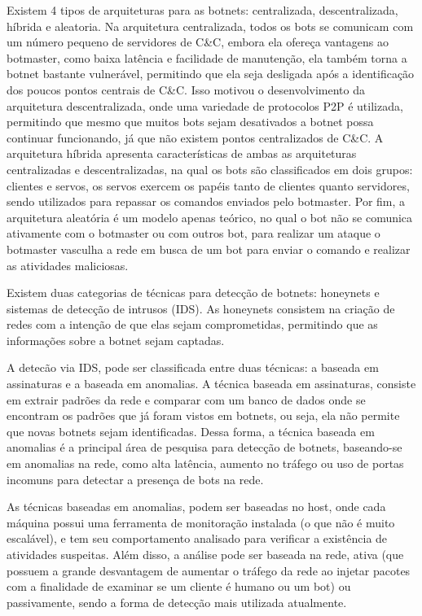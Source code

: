 Existem 4 tipos de arquiteturas para as botnets: centralizada, descentralizada, híbrida e aleatoria. Na arquitetura centralizada, todos os bots se comunicam com um número pequeno de servidores de C\&C, embora ela ofereça vantagens ao botmaster, como baixa latência e facilidade de manutenção, ela também torna a botnet bastante vulnerável, permitindo que ela seja desligada após a identificação dos poucos pontos centrais de C\&C. Isso motivou o desenvolvimento da arquitetura descentralizada, onde uma variedade de protocolos P2P é utilizada, permitindo que mesmo que muitos bots sejam desativados a botnet possa continuar funcionando, já que não existem pontos centralizados de C\&C. A arquitetura híbrida apresenta características de ambas as arquiteturas centralizadas e descentralizadas, na qual os bots são classificados em dois grupos: clientes e servos, os servos exercem os papéis tanto de clientes quanto servidores, sendo utilizados para repassar os comandos enviados pelo botmaster. Por fim, a arquitetura aleatória é um modelo apenas teórico, no qual o bot não se comunica ativamente com o botmaster ou com outros bot, para realizar um ataque o botmaster vasculha a rede em busca de um bot para enviar o comando e realizar as atividades maliciosas.

Existem duas categorias de técnicas para detecção de botnets: honeynets e sistemas de detecção de intrusos (IDS). As honeynets consistem na criação de redes com a intenção de que elas sejam comprometidas, permitindo que as informações sobre a botnet sejam captadas.

A detecão via IDS, pode ser classificada entre duas técnicas: a baseada em assinaturas e a baseada em anomalias. A técnica baseada em assinaturas, consiste em extrair padrões da rede e comparar com um banco de dados onde se encontram os padrões que já foram vistos em botnets, ou seja, ela não permite que novas botnets sejam identificadas. Dessa forma, a técnica baseada em anomalias é a principal área de pesquisa para detecção de botnets, baseando-se em anomalias na rede, como alta latência, aumento no tráfego ou uso de portas incomuns para detectar a presença de bots na rede.

As técnicas baseadas em anomalias, podem ser baseadas no host, onde cada máquina possui uma ferramenta de monitoração instalada (o que não é muito escalável), e tem seu comportamento analisado para verificar a existência de atividades suspeitas. Além disso, a análise pode ser baseada na rede, ativa (que possuem a grande desvantagem de aumentar o tráfego da rede ao injetar pacotes com a finalidade de examinar se um cliente é humano ou um bot) ou passivamente, sendo a forma de detecção mais utilizada atualmente.

